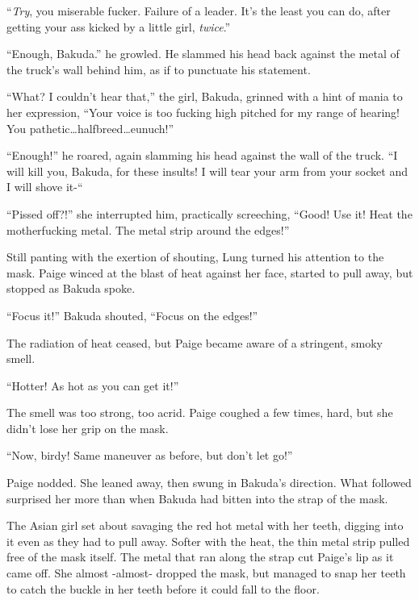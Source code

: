 ``\emph{Try}, you miserable fucker.  Failure of a leader.  It's the least you can do, after getting your ass kicked by a little girl, \emph{twice}.''



``Enough, Bakuda.'' he growled.  He slammed his head back against the metal of the truck's wall behind him, as if to punctuate his statement.



``What?  I couldn't hear that,'' the girl, Bakuda, grinned with a hint of mania to her expression, ``Your voice is too fucking high pitched for my range of hearing!  You pathetic\ldots halfbreed\ldots eunuch!''



``Enough!'' he roared, again slamming his head against the wall of the truck.  ``I will kill you, Bakuda, for these insults!  I will tear your arm from your socket and I will shove it-``



``Pissed off?!'' she interrupted him, practically screeching, ``Good!  Use it!  Heat the motherfucking metal.  The metal strip around the edges!''



Still panting with the exertion of shouting, Lung turned his attention to the mask.  Paige winced at the blast of heat against her face, started to pull away, but stopped as Bakuda spoke.



``Focus it!'' Bakuda shouted, ``Focus on the edges!''



The radiation of heat ceased, but Paige became aware of a stringent, smoky smell.



``Hotter!  As hot as you can get it!''



The smell was too strong, too acrid.  Paige coughed a few times, hard, but she didn't lose her grip on the mask.



``Now, birdy!  Same maneuver as before, but don't let go!''



Paige nodded.  She leaned away, then swung in Bakuda's direction.  What followed surprised her more than when Bakuda had bitten into the strap of the mask.



The Asian girl set about savaging the red hot metal with her teeth, digging into it even as they had to pull away.  Softer with the heat, the thin metal strip pulled free of the mask itself.  The metal that ran along the strap cut Paige's lip as it came off.  She almost -almost- dropped the mask, but managed to snap her teeth to catch the buckle in her teeth before it could fall to the floor.



